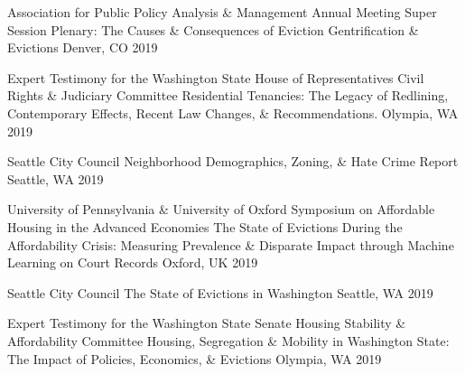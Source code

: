 \begin{cventries}
  \cventry
    {Association for Public Policy Analysis \& Management Annual Meeting Super Session Plenary: The Causes \& Consequences of Eviction} %
    {Gentrification \& Evictions} %
    {Denver, CO} %
    {2019} %
    {}


  \cventry
    {Expert Testimony for the Washington State House of Representatives Civil Rights \& Judiciary Committee} %
    {Residential Tenancies: The Legacy of Redlining, Contemporary Effects, Recent Law Changes, \& Recommendations.} %
    {Olympia, WA} %
    {2019} %
    {}


  \cventry
    {Seattle City Council} %
    {Neighborhood Demographics, Zoning, \& Hate Crime Report} %
    {Seattle, WA} %
    {2019} %
    {}

  \cventry
    {University of Pennsylvania \& University of Oxford Symposium on Affordable Housing in the Advanced Economies} %
    {The State of Evictions During the Affordability Crisis: Measuring Prevalence \& Disparate Impact through Machine Learning on Court Records} %
    {Oxford, UK} %
    {2019} %
    {}

  \cventry
    {Seattle City Council} %
    {The State of Evictions in Washington} %
    {Seattle, WA} %
    {2019} %
    {}

  \cventry
    {Expert Testimony for the Washington State Senate Housing Stability \& Affordability Committee} %
    {Housing, Segregation \& Mobility in Washington State: The Impact of Policies, Economics, \& Evictions} %
    {Olympia, WA} %
    {2019} %
    {}


\end{cventries}
